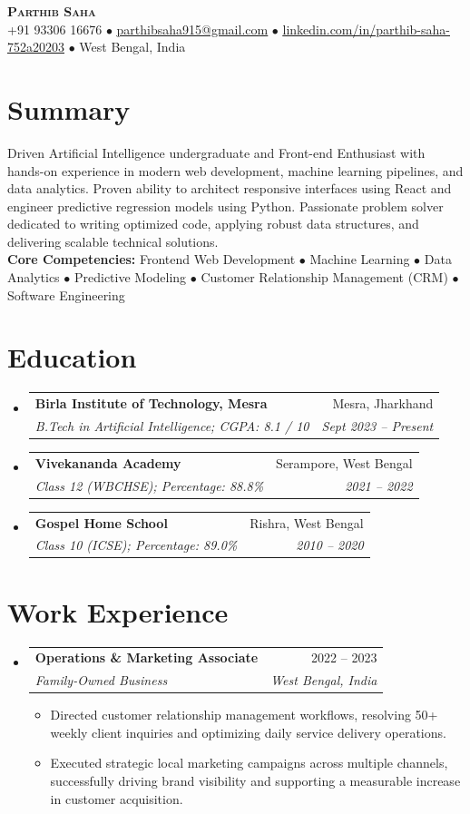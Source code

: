 \documentclass[letterpaper,11pt]{article}
\makeatletter
\newcommand{\resumeItem}[1]{
  \item\small{
    {#1 \vspace{-2pt}}
  }
}
\newcommand{\resumeSubheading}[4]{
  \vspace{-2pt}\item
    \begin{tabular*}{0.97\textwidth}[t]{l@{\extracolsep{\fill}}r}
      \textbf{#1} & #2 \\
      \textit{\small#3} & \textit{\small #4} \\
    \end{tabular*}\vspace{-7pt}
}
\newcommand{\resumeSubHeadingListStart}{\begin{itemize}[leftmargin=0.15in, label={}]}
\newcommand{\resumeSubHeadingListEnd}{\end{itemize}}
\newcommand{\resumeItemListStart}{\begin{itemize}}
\newcommand{\resumeItemListEnd}{\end{itemize}\vspace{-5pt}}
\makeatother
\begin{document}
\begin{center}
    \textbf{\Huge \scshape \color{brandorange} Parthib Saha} \\ \vspace{2pt}
    \small +91 93306 16676 $\bullet$ \href{mailto:parthibsaha915@gmail.com}{\underline{parthibsaha915@gmail.com}} $\bullet$ 
    \href{https://linkedin.com/in/parthib-saha-752a20203/}{\underline{linkedin.com/in/parthib-saha-752a20203}} $\bullet$
    West Bengal, India
\end{center}

\section{Summary}
  \vspace{2pt}
  \small{Driven Artificial Intelligence undergraduate and Front-end Enthusiast with hands-on experience in modern web development, machine learning pipelines, and data analytics. Proven ability to architect responsive interfaces using React and engineer predictive regression models using Python. Passionate problem solver dedicated to writing optimized code, applying robust data structures, and delivering scalable technical solutions.} \\ \vspace{4pt}
  \small{\textbf{Core Competencies:} Frontend Web Development $\bullet$ Machine Learning $\bullet$ Data Analytics $\bullet$ Predictive Modeling $\bullet$ Customer Relationship Management (CRM) $\bullet$ Software Engineering}

\section{Education}
  \resumeSubHeadingListStart
    \resumeSubheading
      {Birla Institute of Technology, Mesra}{Mesra, Jharkhand}
      {B.Tech in Artificial Intelligence; CGPA: 8.1 / 10}{Sept 2023 -- Present}
    \resumeSubheading
      {Vivekananda Academy}{Serampore, West Bengal}
      {Class 12 (WBCHSE); Percentage: 88.8\%}{2021 -- 2022}
    \resumeSubheading
      {Gospel Home School}{Rishra, West Bengal}
      {Class 10 (ICSE); Percentage: 89.0\%}{2010 -- 2020}
  \resumeSubHeadingListEnd


\section{Work Experience}
  \resumeSubHeadingListStart
    \resumeSubheading
      {Operations \& Marketing Associate}{2022 -- 2023}
      {Family-Owned Business}{West Bengal, India}
      \resumeItemListStart
        \resumeItem{Directed customer relationship management workflows, resolving 50+ weekly client inquiries and optimizing daily service delivery operations.}
        \resumeItem{Executed strategic local marketing campaigns across multiple channels, successfully driving brand visibility and supporting a measurable increase in customer acquisition.}
      \resumeItemListEnd
  \resumeSubHeadingListEnd
\end{document}
